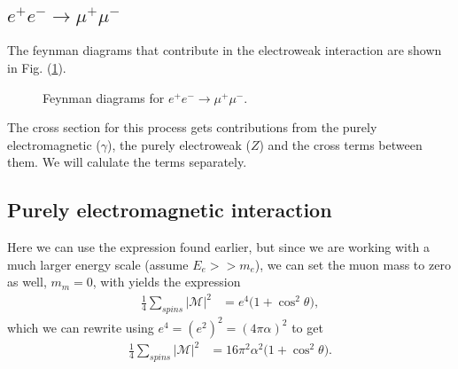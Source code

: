 \documentclass[11pt]{article}
\begin{document}
\subsection{$e^+ e^- \rightarrow \mu^+ \mu^-$}
\begin{flushleft}
The feynman diagrams that contribute in the electroweak interaction are shown in Fig. (\ref{fig:: ee- mu mu}).
\begin{figure}[H]
\centering
{}
\caption{Feynman diagrams for $e^+e^- \rightarrow \mu^+ \mu^-$.}
\label{fig:: ee- mu mu}
\end{figure}
The cross section for this process gets contributions from the purely electromagnetic ($\gamma$), the purely electroweak ($Z$) and the cross terms between them. We will calulate the terms separately. 
\end{flushleft}

\subsection{Purely electromagnetic interaction}

\begin{flushleft}
Here we can use the expression found earlier, but since we are working with a much larger energy scale (assume $E_e >> m_e$), we can set the muon mass to zero as well, $m_m = 0$, with yields the expression
\begin{align*}
\frac{1}{4} \sum_{spins} |\mathcal{M}|^2 
&= e^4 \big( 1 + \cos^2 \theta \big),
\end{align*}
which we can rewrite using $e^4 = (e^2)^2 = (4 \pi \alpha)^2$ to get
\begin{align*}
\frac{1}{4} \sum_{spins} |\mathcal{M}|^2 
&= 16 \pi^2 \alpha^2 \big( 1 + \cos^2 \theta \big).
\end{align*}
\end{flushleft}
\end{document}
